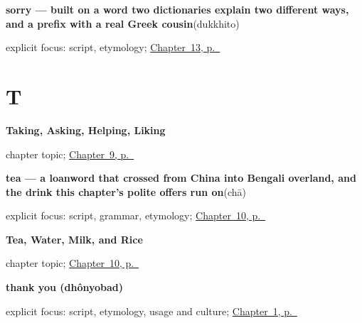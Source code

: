 \noindent\begin{minipage}[t]{\linewidth}
\raggedright
\textbf{sorry — built on a word two dictionaries explain two different ways, and a prefix with a real Greek cousin}\enspace\emph{}\enspace(dukkhito)\par
\footnotesize explicit focus: script, etymology; \hyperref[ch:bn-please-sorry-welcome]{Chapter~13, p.~\pageref*{ch:bn-please-sorry-welcome}}
\end{minipage}\par\smallskip

\section*{T}

\noindent\begin{minipage}[t]{\linewidth}
\raggedright
\textbf{Taking, Asking, Helping, Liking}\par
\footnotesize chapter topic; \hyperref[ch:bn-conjunct-verbs]{Chapter~9, p.~\pageref*{ch:bn-conjunct-verbs}}
\end{minipage}\par\smallskip

\noindent\begin{minipage}[t]{\linewidth}
\raggedright
\textbf{tea — a loanword that crossed from China into Bengali overland, and the drink this chapter's polite offers run on}\enspace\emph{}\enspace(chā)\par
\footnotesize explicit focus: script, grammar, etymology; \hyperref[ch:bn-tea-water-milk-rice]{Chapter~10, p.~\pageref*{ch:bn-tea-water-milk-rice}}
\end{minipage}\par\smallskip

\noindent\begin{minipage}[t]{\linewidth}
\raggedright
\textbf{Tea, Water, Milk, and Rice}\par
\footnotesize chapter topic; \hyperref[ch:bn-tea-water-milk-rice]{Chapter~10, p.~\pageref*{ch:bn-tea-water-milk-rice}}
\end{minipage}\par\smallskip

\noindent\begin{minipage}[t]{\linewidth}
\raggedright
\textbf{thank you (dhônyobad)}\enspace\emph{}\par
\footnotesize explicit focus: script, etymology, usage and culture; \hyperref[ch:greetings]{Chapter~1, p.~\pageref*{ch:greetings}}
\end{minipage}\par\smallskip

